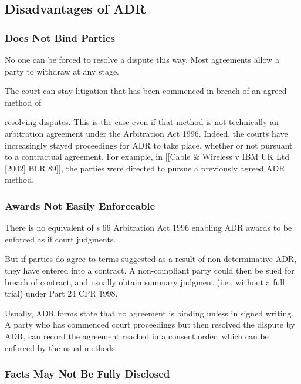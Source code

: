 \documentclass[
]{article}
\begin{document}
\hypertarget{disadvantages-of-adr}{%
\subsection{Disadvantages of ADR}\label{disadvantages-of-adr}}

\hypertarget{does-not-bind-parties}{%
\subsubsection{Does Not Bind Parties}\label{does-not-bind-parties}}

No one can be forced to resolve a dispute this way. Most agreements
allow a party to withdraw at any stage.

The court can stay litigation that has been commenced in breach of an
agreed method of

resolving disputes. This is the case even if that method is not
technically an arbitration agreement under the Arbitration Act 1996.
Indeed, the courts have increasingly stayed proceedings for ADR to take
place, whether or not pursuant to a contractual agreement. For example,
in {[}{[}Cable \& Wireless v IBM UK Ltd {[}2002{]} BLR 89{]}{]}, the
parties were directed to pursue a previously agreed ADR method.

\hypertarget{awards-not-easily-enforceable}{%
\subsubsection{Awards Not Easily
Enforceable}\label{awards-not-easily-enforceable}}

There is no equivalent of s 66 Arbitration Act 1996 enabling ADR awards
to be enforced as if court judgments.

But if parties do agree to terms suggested as a result of
non-determinative ADR, they have entered into a contract. A
non-compliant party could then be sued for breach of contract, and
usually obtain summary judgment (i.e., without a full trial) under Part
24 CPR 1998.

Usually, ADR forms state that no agreement is binding unless in signed
writing. A party who has commenced court proceedings but then resolved
the dispute by ADR, can record the agreement reached in a consent order,
which can be enforced by the usual methods.

\hypertarget{facts-may-not-be-fully-disclosed}{%
\subsubsection{Facts May Not Be Fully
Disclosed}\label{facts-may-not-be-fully-disclosed}}
\end{document}
